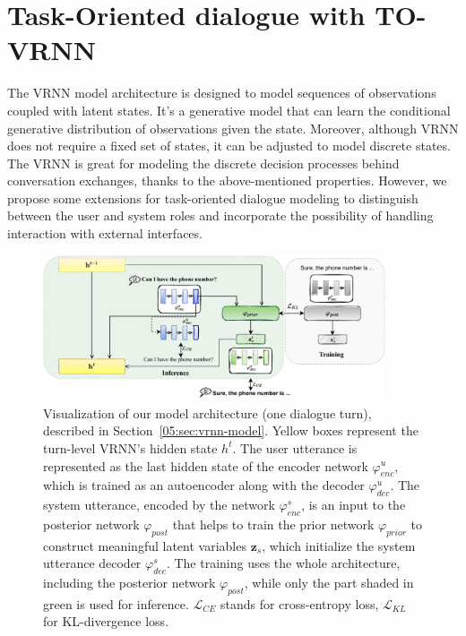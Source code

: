 \section{Task-Oriented dialogue with TO-VRNN}
The VRNN model architecture is designed to model sequences of observations coupled with latent states.
It's a generative model that can learn the conditional generative distribution of observations given the state.
Moreover, although VRNN does not require a fixed set of states, it can be adjusted to model discrete states.
The VRNN is great for modeling the discrete decision processes behind conversation exchanges, thanks to the above-mentioned properties.
However, we propose some extensions for task-oriented dialogue modeling to distinguish between the user and system roles and incorporate the possibility of handling interaction with external interfaces.
\begin{figure}[t]
    \centering
    \includegraphics[width=0.9\textwidth]{images/vrnn-diagram.pdf}
    \caption{Visualization of our model architecture (one dialogue turn), described in Section~\ref{05:sec:vrnn-model}. Yellow boxes represent the turn-level VRNN's hidden state $h^t$. The user utterance is represented as the last hidden state of the encoder network $\varphi_{enc}^u$, which is trained as an autoencoder along with the decoder $\varphi_{dec}^u$. The system utterance, encoded by the network $\varphi_{enc}^s$, is an input to the posterior network $\varphi_{post}$ that helps to train the prior network $\varphi_{prior}$ to construct meaningful latent variables $\mathbf{z}_s$, which initialize the system utterance decoder $\varphi_{dec}^s$. The training uses the whole architecture, including the posterior network $\varphi_{post}$, while only the part shaded in green is used for inference. $\mathcal{L}_{CE}$ stands for cross-entropy loss, $\mathcal{L}_{KL}$ for KL-divergence loss.}
    \label{05:fig:vrnn_method}
\end{figure}


